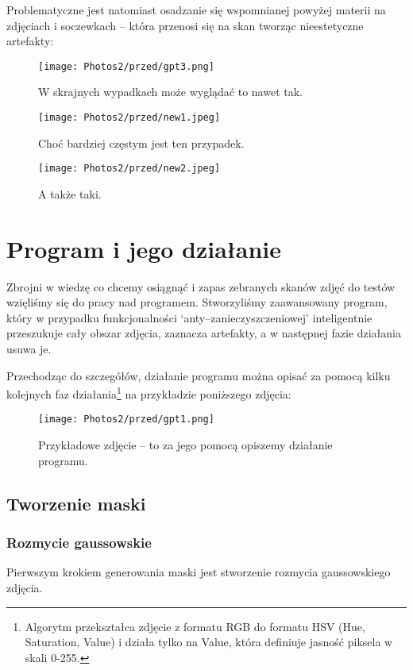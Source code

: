 \documentclass[]{mwart}
\begin{document}
Problematyczne jest natomiast osadzanie się wspomnianej powyżej materii na zdjęciach i soczewkach -- która przenosi się na
skan tworząc nieestetyczne artefakty:

\begin{figure}[H]
    \centering
    \texttt{[image: Photos2/przed/gpt3.png]}
    \caption{W skrajnych wypadkach może wyglądać to nawet tak.}
\end{figure}

\begin{figure}[H]
    \centering
    \texttt{[image: Photos2/przed/new1.jpeg]}
    \caption{Choć bardziej częstym jest ten przypadek.}
\end{figure}

\begin{figure}[H]
    \centering
    \texttt{[image: Photos2/przed/new2.jpeg]}
    \caption{A także taki.}
\end{figure}

\newpage
\section{Program i jego działanie}
Zbrojni w wiedzę co chcemy osiągnąć i zapas zebranych skanów zdjęć do testów wzięliśmy się do pracy
nad programem. Stworzyliśmy zaawansowany program, który w przypadku funkcjonalności
`anty--zanieczyszczeniowej' inteligentnie przeszukuje cały obszar zdjęcia, zaznacza artefakty,
a w następnej fazie działania usuwa je.

Przechodząc do szczegółów, działanie programu można opisać za pomocą kilku kolejnych faz działania\footnote{Algorytm
    przekształca zdjęcie z formatu RGB do formatu HSV (Hue, Saturation, Value) i działa tylko na Value, która definiuje jasność piksela w skali 0-255.} na przykładzie poniższego zdjęcia:

\begin{figure}[H]
    \centering
    \texttt{[image: Photos2/przed/gpt1.png]}
    \caption{Przykładowe zdjęcie -- to za jego pomocą opiszemy działanie programu.}
\end{figure}

\subsection{Tworzenie maski}
\subsubsection{Rozmycie gaussowskie}
Pierwszym krokiem generowania maski jest stworzenie rozmycia gaussowskiego zdjęcia.
\end{document}
